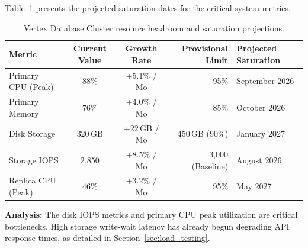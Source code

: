 Table~\ref{tab:headroom} presents the projected saturation dates for the critical system metrics.

\begin{table}[htbp]
  \centering
  \caption{Vertex Database Cluster resource headroom and saturation projections.}
  \label{tab:headroom}
  \begin{tabularx}{\textwidth}{l c c r X}
    \toprule
    \textbf{Metric} & \textbf{Current Value} & \textbf{Growth Rate} & \textbf{Provisional Limit} & \textbf{Projected Saturation} \\
    \midrule
    Primary CPU (Peak) & 88\% & +5.1\% / Mo & 95\% & September 2026 \\
    \rowcolor{lightgray} Primary Memory & 76\% & +4.0\% / Mo & 85\% & October 2026 \\
    Disk Storage & 320\,GB & +22\,GB / Mo & 450\,GB (90\%) & January 2027 \\
    \rowcolor{lightgray} Storage IOPS & 2,850 & +8.5\% / Mo & 3,000 (Baseline) & August 2026 \\
    Replica CPU (Peak) & 46\% & +3.2\% / Mo & 95\% & May 2027 \\
    \bottomrule
  \end{tabularx}
\end{table}

\textbf{Analysis:} The disk IOPS metrics and primary CPU peak utilization are critical bottlenecks. High storage write-wait latency has already begun degrading API response times, as detailed in Section~\ref{sec:load_testing}.
